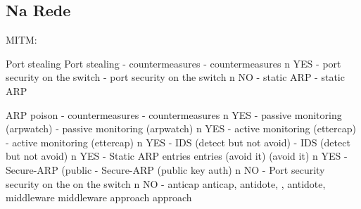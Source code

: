 \subsection{Na Rede}

MITM:

Port stealing Port stealing - countermeasures - countermeasures
n YES - port security on the switch - port security on the switch
n NO - static ARP - static ARP

ARP poison - countermeasures - countermeasures
n YES - passive monitoring (arpwatch) - passive monitoring (arpwatch)
n YES - active monitoring (ettercap) - active monitoring (ettercap)
n YES - IDS (detect but not avoid) - IDS (detect but not avoid)
n YES - Static ARP entries entries (avoid it) (avoid it)
n YES - Secure-ARP (public - Secure-ARP (public key auth)
n NO - Port security security on the on the switch
n NO - anticap anticap, antidote, , antidote, middleware middleware approach approach





